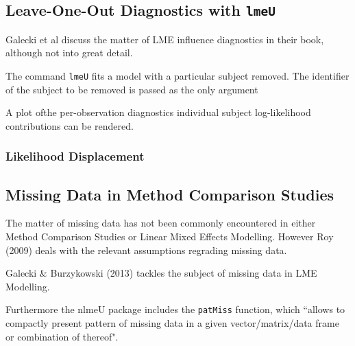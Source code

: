 \documentclass[12pt, a4paper]{report}
\theoremstyle{plain}
\theoremstyle{definition}
\theoremstyle{remark}
\begin{document}
\subsection*{Leave-One-Out Diagnostics with \texttt{lmeU}}
Galecki et al discuss the matter of LME influence diagnostics in their book, although not into great detail.


The command \texttt{lmeU} fits a model with a particular subject removed. The identifier of the subject to be removed is passed as the only argument

A plot ofthe per-observation diagnostics individual subject log-likelihood contributions can be rendered.

\subsubsection*{Likelihood Displacement}




\newpage
%


\newpage
\subsection*{Missing Data in Method Comparison Studies}

The matter of missing data has not been commonly encountered in either Method Comparison Studies or Linear Mixed Effects Modelling. However Roy (2009) deals with the relevant assumptions regrading missing data.

Galecki \& Burzykowski (2013) tackles the subject of missing data in LME Modelling.

Furthermore the nlmeU package includes the \texttt{patMiss} function, which ``allows to compactly present pattern of missing data in a given vector/matrix/data
frame or combination of thereof".

\newpage

\end{document}
